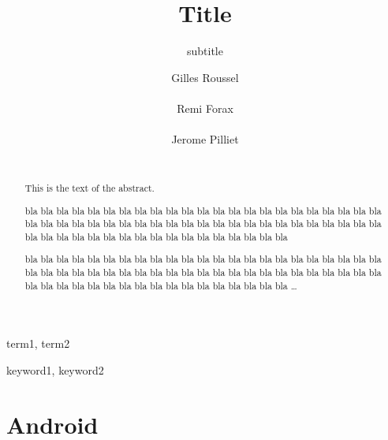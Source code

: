\documentclass{sig-alternate}
\begin{document}

\title{Title}
\subtitle{subtitle}

\author{
  \alignauthor Gilles Roussel\\
    \\
  \alignauthor Remi Forax\\
    \\
  \alignauthor Jerome Pilliet\\
    \\
}

\setlength{\pdfpageheight}{\paperheight}
\setlength{\pdfpagewidth}{\paperwidth}

\maketitle

\begin{abstract}
This is the text of the abstract.

bla bla bla bla bla bla bla bla bla
bla bla bla bla bla bla bla bla bla
bla bla bla bla bla bla bla bla bla
bla bla bla bla bla bla bla bla bla
bla bla bla bla bla bla bla bla bla
bla bla bla bla bla bla bla bla bla
bla bla bla bla bla bla bla bla bla

bla bla bla bla bla bla bla bla bla
bla bla bla bla bla bla bla bla bla
bla bla bla bla bla bla bla bla bla
bla bla bla bla bla bla bla bla bla
bla bla bla bla bla bla bla bla bla
bla bla bla bla bla bla bla bla bla
bla bla bla bla bla bla bla bla bla
\dots
\end{abstract}


\terms
term1, term2

\keywords
keyword1, keyword2

  \section{Android}
\end{document}
